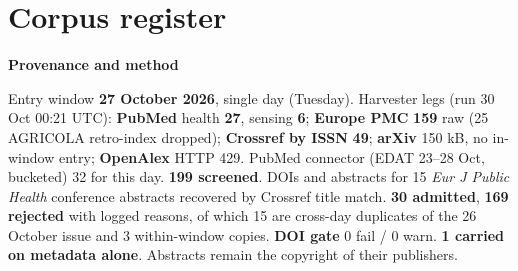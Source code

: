 \documentclass[10pt]{article}
\begin{document}
\clearpage
\section*{\sffamily\bfseries\color{Deep}Corpus register}
\vspace{-1.5mm}{\color{Amber}\rule{\linewidth}{1.1pt}}\vspace{2.5mm}



\vspace{2mm}

\begin{keybox}
{\sffamily\bfseries\footnotesize\color{Deep}Provenance and method}\\[1.2mm]
{\fontsize{7.2}{8.8}\selectfont
Entry window \textbf{27 October 2026}, single day (Tuesday). Harvester legs (run 30 Oct 00:21 UTC): \textbf{PubMed}
health \textbf{27}, sensing \textbf{6}; \textbf{Europe PMC} \textbf{159} raw (25 AGRICOLA retro-index dropped);
\textbf{Crossref by ISSN} \textbf{49}; \textbf{arXiv} 150 kB, no in-window entry; \textbf{OpenAlex} HTTP 429. PubMed
connector (EDAT 23--28 Oct, bucketed) 32 for this day. \textbf{199 screened}. DOIs and abstracts for 15 \emph{Eur J
Public Health} conference abstracts recovered by Crossref title match. \textbf{30 admitted}, \textbf{169 rejected}
with logged reasons, of which 15 are cross-day duplicates of the 26 October issue and 3 within-window copies.
\textbf{DOI gate} 0 fail / 0 warn. \textbf{1 carried on metadata alone}. Abstracts remain the copyright of their
publishers.\par}
\end{keybox}
\end{document}
